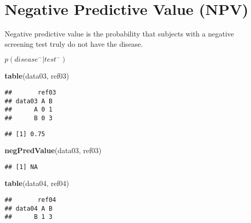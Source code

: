\documentclass[
]{article}
\newenvironment{Shaded}{\begin{snugshade}}{\end{snugshade}}
\newcommand{\CommentTok}[1]{\textcolor[rgb]{0.56,0.35,0.01}{\textit{#1}}}
\newcommand{\KeywordTok}[1]{\textcolor[rgb]{0.13,0.29,0.53}{\textbf{#1}}}
\newcommand{\NormalTok}[1]{#1}
\begin{document}
\hypertarget{negative-predictive-value-npv}{%
\section{Negative Predictive Value
(NPV)}\label{negative-predictive-value-npv}}

Negative predictive value is the probability that subjects with a
negative screening test truly do not have the disease.

\(p(disease^-|test^-)\)

\begin{Shaded}
\begin{Highlighting}[]
\KeywordTok{table}\NormalTok{(data03, ref03)}
\end{Highlighting}
\end{Shaded}

\begin{verbatim}
##       ref03
## data03 A B
##      A 0 1
##      B 0 3
\end{verbatim}

\begin{Shaded}
\end{Shaded}

\begin{verbatim}
## [1] 0.75
\end{verbatim}

\begin{Shaded}
\begin{Highlighting}[]
\KeywordTok{negPredValue}\NormalTok{(data03, ref03) }
\end{Highlighting}
\end{Shaded}

\begin{verbatim}
## [1] NA
\end{verbatim}

\begin{Shaded}
\begin{Highlighting}[]
\KeywordTok{table}\NormalTok{(data04, ref04)}
\end{Highlighting}
\end{Shaded}

\begin{verbatim}
##       ref04
## data04 A B
##      B 1 3
\end{verbatim}

\begin{Shaded}
\end{Shaded}
\end{document}
